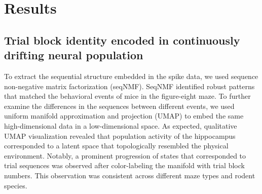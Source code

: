 \section{Results}

\subsection{Trial block identity encoded in continuously drifting neural population}

To extract the sequential structure embedded in the spike data, we used sequence non-negative matrix factorization (seqNMF). SeqNMF identified robust patterns that matched the behavioral events of mice in the figure-eight maze. To further examine the differences in the sequences between different events, we used uniform manifold approximation and projection (UMAP) to embed the same high-dimensional data in a low-dimensional space. As expected, qualitative UMAP visualization revealed that population activity of the hippocampus corresponded to a latent space that topologically resembled the physical environment. Notably, a prominent progression of states that corresponded to trial sequences was observed after color-labeling the manifold with trial block numbers. This observation was consistent across different maze types and rodent species.

